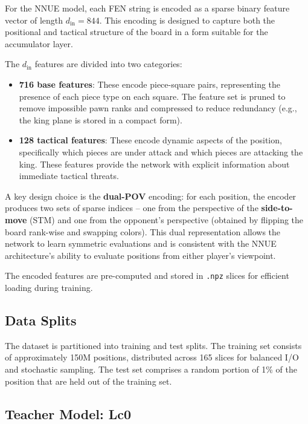 For the NNUE model, each FEN string is encoded as a sparse binary feature vector of length $d_{\text{in}} = 844$. This encoding is designed to capture both the positional and tactical structure of the board in a form suitable for the accumulator layer.

The $d_{\text{in}}$ features are divided into two categories:

\begin{itemize}
\item \textbf{716 base features}: These encode piece-square pairs, representing the presence of each piece type on each square. The feature set is pruned to remove impossible pawn ranks and compressed to reduce redundancy (e.g., the king plane is stored in a compact form).
\item \textbf{128 tactical features}: These encode dynamic aspects of the position, specifically which pieces are under attack and which pieces are attacking the king. These features provide the network with explicit information about immediate tactical threats.
\end{itemize}

A key design choice is the \textbf{dual-POV} encoding: for each position, the encoder produces two sets of sparse indices -- one from the perspective of the \textbf{side-to-move} (STM) and one from the opponent's perspective (obtained by flipping the board rank-wise and swapping colors). This dual representation allows the network to learn symmetric evaluations and is consistent with the NNUE architecture's ability to evaluate positions from either player's viewpoint.

The encoded features are pre-computed and stored in \texttt{.npz} slices for efficient loading during training.

\subsection{Data Splits}

The dataset is partitioned into training and test splits. The training set consists of approximately 150M positions, distributed across 165 slices for balanced I/O and stochastic sampling. The test set comprises a random portion of 1\% of the position that are held out of the training set.

\subsection{Teacher Model: Lc0}

